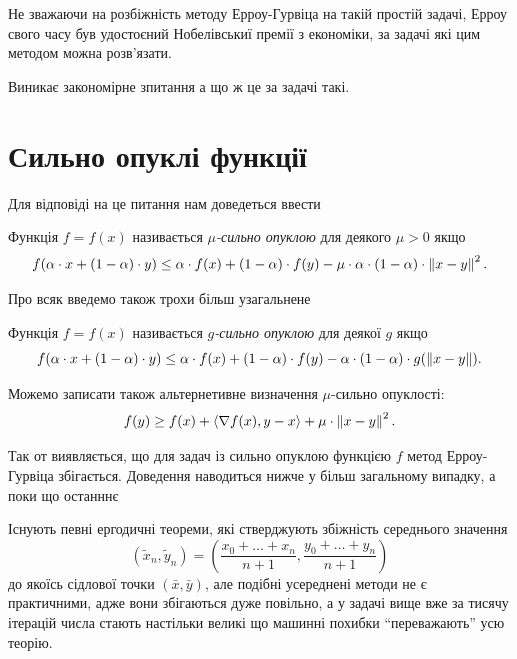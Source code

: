 \begin{remark}
    Не зважаючи на розбіжність методу Ерроу-Гурвіца на такій простій задачі, Ерроу свого часу був удостоєний Нобелівськиї премії з економіки, за задачі які цим методом можна розв'язати.
\end{remark}

Виникає закономірне зпитання а що ж це за задачі такі. 

\section{Сильно опуклі функції}

Для відповіді на це питання нам доведеться ввести 

\begin{definition}
    Функція $f = f(x)$ називається \emph{$\mu$-сильно опуклою} для деякого $\mu > 0$ якщо
    \begin{equation}
        f(\alpha \cdot x + (1 - \alpha) \cdot y) \le \alpha \cdot f(x) + (1 - \alpha) \cdot f(y) - \mu \cdot \alpha \cdot (1 - \alpha) \cdot \left\| x - y \right\|^2.
    \end{equation}
\end{definition}

Про всяк введемо також трохи більш узагальнене

\begin{definition}
    Функція $f = f(x)$ називається \emph{$g$-сильно опуклою} для деякої $g$ якщо
    \begin{equation}
        f(\alpha \cdot x + (1 - \alpha) \cdot y) \le \alpha \cdot f(x) + (1 - \alpha) \cdot f(y) - \alpha \cdot (1 - \alpha) \cdot g(\left\| x - y \right\|).
    \end{equation}
\end{definition}

Можемо записати також альтернетивне визначення
$\mu$-сильно опуклості:
\begin{equation}
    f(y) \ge f(x) + \left\langle \nabla f(x), y - x \right\rangle + \mu \cdot \left\| x - y \right\|^2.
\end{equation}

Так от виявляється, що для задач із сильно опуклою функцією $f$ метод Ерроу-Гурвіца збігається. Доведення наводиться нижче у більш загальному випадку, а поки що останннє
\begin{remark}
    Існують певні ергодичні теореми, які стверджують збіжність середнього значення 
    \begin{equation}
        \left(\tilde x_n, \tilde y_n\right) = \left( \frac{x_0 + \ldots + x_n}{n + 1}, \frac{y_0 + \ldots + y_n}{n + 1} \right)
    \end{equation}
    до якоїсь сідлової точки $(\bar x, \bar y)$, але подібні усереднені методи не є практичними, адже вони збігаються дуже повільно, а у задачі вище вже за тисячу ітерацій числа стають настільки великі що машинні похибки ``переважають'' усю теорію.
\end{remark}

